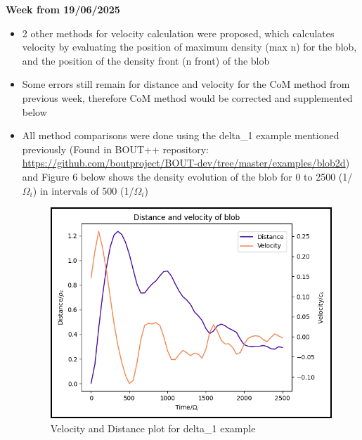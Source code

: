 \documentclass{article}
\begin{document}
\begin{arrowlist}
    \item \textbf{Week from 19/06/2025}
        \begin{itemize}
            \item 2 other methods for velocity calculation were proposed, which calculates velocity by evaluating the position of maximum density (max n) for the blob, and the position of the density front (n front) of the blob
            \item Some errors still remain for distance and velocity for the CoM method from previous week, therefore CoM method would be corrected and supplemented below
            \item All method comparisons were done using the delta\_1 example mentioned previously (Found in BOUT++ repository: \url{https://github.com/boutproject/BOUT-dev/tree/master/examples/blob2d}) and Figure 6 below shows the density evolution of the blob for 0 to 2500 (1/$\Omega_i$) in intervals of 500 (1/$\Omega_i$)

    \begin{figure}[H]
    \centering
        \includegraphics[height=0.5\textheight]{./Fig/Fig3 vel plot_v2.png}
        \normalsize{\caption{Velocity and Distance plot for delta\_1 example}
        \label{fig:fig4}}
    \end{figure}   
            

\end{itemize}
\end{arrowlist}
\end{document}
